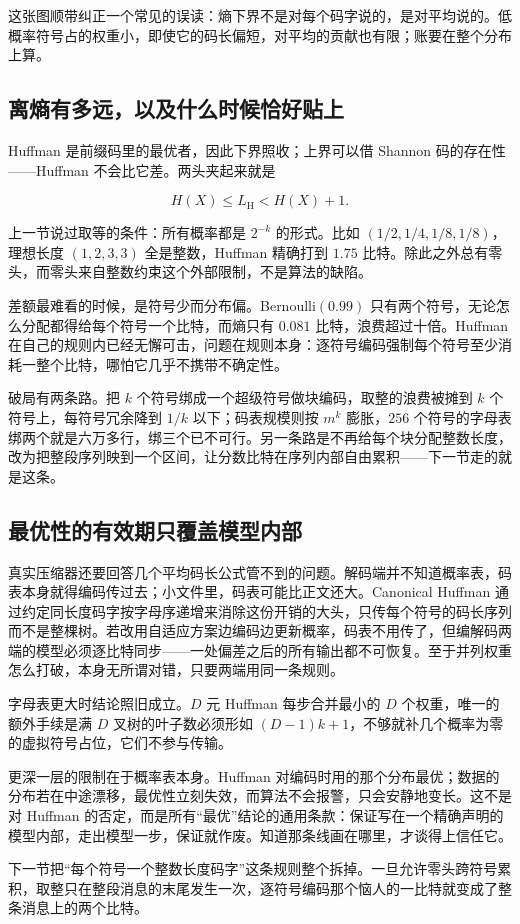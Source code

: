 这张图顺带纠正一个常见的误读：熵下界不是对每个码字说的，是对平均说的。低概率符号占的权重小，即使它的码长偏短，对平均的贡献也有限；账要在整个分布上算。

\subsection{离熵有多远，以及什么时候恰好贴上}

Huffman 是前缀码里的最优者，因此下界照收；上界可以借 Shannon 码的存在性——Huffman 不会比它差。两头夹起来就是

\[
H(X)\le L_{\mathrm H}<H(X)+1.
\]

上一节说过取等的条件：所有概率都是 \(2^{-k}\) 的形式。比如 \((1/2,1/4,1/8,1/8)\)，理想长度 \((1,2,3,3)\) 全是整数，Huffman 精确打到 \(1.75\) 比特。除此之外总有零头，而零头来自整数约束这个外部限制，不是算法的缺陷。

差额最难看的时候，是符号少而分布偏。Bernoulli\((0.99)\) 只有两个符号，无论怎么分配都得给每个符号一个比特，而熵只有 \(0.081\) 比特，浪费超过十倍。Huffman 在自己的规则内已经无懈可击，问题在规则本身：逐符号编码强制每个符号至少消耗一整个比特，哪怕它几乎不携带不确定性。

破局有两条路。把 \(k\) 个符号绑成一个超级符号做块编码，取整的浪费被摊到 \(k\) 个符号上，每符号冗余降到 \(1/k\) 以下；码表规模则按 \(m^k\) 膨胀，\(256\) 个符号的字母表绑两个就是六万多行，绑三个已不可行。另一条路是不再给每个块分配整数长度，改为把整段序列映到一个区间，让分数比特在序列内部自由累积——下一节走的就是这条。

\subsection{最优性的有效期只覆盖模型内部}

真实压缩器还要回答几个平均码长公式管不到的问题。解码端并不知道概率表，码表本身就得编码传过去；小文件里，码表可能比正文还大。Canonical Huffman 通过约定同长度码字按字母序递增来消除这份开销的大头，只传每个符号的码长序列而不是整棵树。若改用自适应方案边编码边更新概率，码表不用传了，但编解码两端的模型必须逐比特同步——一处偏差之后的所有输出都不可恢复。至于并列权重怎么打破，本身无所谓对错，只要两端用同一条规则。

字母表更大时结论照旧成立。\(D\) 元 Huffman 每步合并最小的 \(D\) 个权重，唯一的额外手续是满 \(D\) 叉树的叶子数必须形如 \((D-1)k+1\)，不够就补几个概率为零的虚拟符号占位，它们不参与传输。

更深一层的限制在于概率表本身。Huffman 对编码时用的那个分布最优；数据的分布若在中途漂移，最优性立刻失效，而算法不会报警，只会安静地变长。这不是对 Huffman 的否定，而是所有``最优''结论的通用条款：保证写在一个精确声明的模型内部，走出模型一步，保证就作废。知道那条线画在哪里，才谈得上信任它。

下一节把``每个符号一个整数长度码字''这条规则整个拆掉。一旦允许零头跨符号累积，取整只在整段消息的末尾发生一次，逐符号编码那个恼人的一比特就变成了整条消息上的两个比特。
